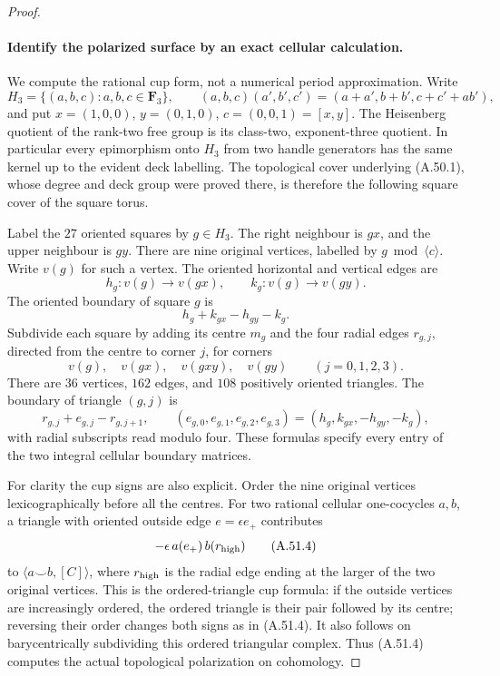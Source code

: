 \begin{proof}
\paragraph{Identify the polarized surface by an exact cellular calculation.}
We compute the rational cup form, not a numerical
period approximation. Write
\[
 H_3=\{(a,b,c):a,b,c\in\mathbf F_3\},\qquad
 (a,b,c)(a',b',c')=(a+a',b+b',c+c'+ab'),
\]
and put \(x=(1,0,0)\), \(y=(0,1,0)\),
\(c=(0,0,1)=[x,y]\). The Heisenberg quotient
of the rank-two free group is its class-two,
exponent-three quotient. In particular every
epimorphism onto \(H_3\) from two handle
generators has the same kernel up to the evident
deck labelling. The topological cover underlying
(A.50.1), whose degree and deck group were proved
there, is therefore the following square cover
of the square torus.

Label the \(27\) oriented squares by \(g\in H_3\).
The right neighbour is \(gx\), and the upper
neighbour is \(gy\). There are nine original
vertices, labelled by \(g\bmod\langle c\rangle\).
Write \(v(g)\) for such a vertex. The oriented
horizontal and vertical edges are
\[
 h_g:v(g)\longrightarrow v(gx),\qquad
 k_g:v(g)\longrightarrow v(gy).
\]
The oriented boundary of square \(g\) is
\[
                       h_g+k_{gx}-h_{gy}-k_g.       \tag{A.51.2}
\]
Subdivide each square by adding its centre \(m_g\)
and the four radial edges \(r_{g,j}\), directed
from the centre to corner \(j\), for corners
\[
        v(g),\quad v(gx),\quad v(gxy),\quad v(gy)
                     \qquad(j=0,1,2,3).
\]
There are \(36\) vertices, \(162\) edges, and
\(108\) positively oriented triangles. The
boundary of triangle \((g,j)\) is
\[
                   r_{g,j}+e_{g,j}-r_{g,j+1},
      \qquad(e_{g,0},e_{g,1},e_{g,2},e_{g,3})
                   =(h_g,k_{gx},-h_{gy},-k_g),       \tag{A.51.3}
\]
with radial subscripts read modulo four.
These formulas specify every entry of the two
integral cellular boundary matrices.

For clarity the cup signs are also explicit.
Order the nine original vertices lexicographically
before all the centres. For two rational cellular
one-cocycles \(a,b\), a triangle with oriented
outside edge \(e=\epsilon e_+\) contributes
\[
                -\epsilon\,a(e_+)\,b(r_{\rm high})
                                                               \tag{A.51.4}
\]
to \(\langle a\smile b,[C]\rangle\), where
\(r_{\rm high}\) is the radial edge ending at
the larger of the two original vertices. This
is the ordered-triangle cup formula: if the
outside vertices are increasingly ordered, the
ordered triangle is their pair followed by its
centre; reversing their order changes both signs
as in (A.51.4). It also follows on barycentrically
subdividing this ordered triangular complex.
Thus (A.51.4) computes the actual topological
polarization on cohomology.


\end{proof}
